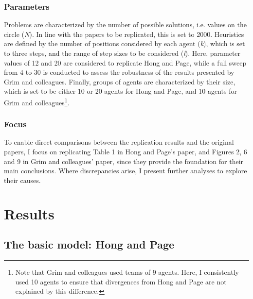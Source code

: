 \subsubsection{Parameters}

Problems are characterized by the number of possible solutions, i.e. values on the circle (\emph{N}). In line with the papers to be replicated, this is set to 2000. Heuristics are defined by the number of positions considered by each agent (\emph{k}), which is set to three steps, and the range of step sizes to be considered (\emph{l}). Here, parameter values of 12 and 20 are considered to replicate Hong and Page, while a full sweep from 4 to 30 is conducted to assess the robustness of the results presented by Grim and colleagues. Finally, groups of agents are characterized by their size, which is set to be either 10 or 20 agents for Hong and Page, and 10 agents for Grim and colleagues\footnote{Note that Grim and colleagues used teams of 9 agents. Here, I consistently used 10 agents to ensure that divergences from Hong and Page are not explained by this difference.}.

\subsubsection{Focus}

To enable direct comparisons between the replication results and the original papers, I focus on replicating Table 1 in Hong and Page's paper, and Figures 2, 6 and 9 in Grim and colleagues' paper, since they provide the foundation for their main conclusions. Where discrepancies arise, I present further analyses to explore their causes.

\section{Results}

\subsection{The basic model: Hong and Page}

